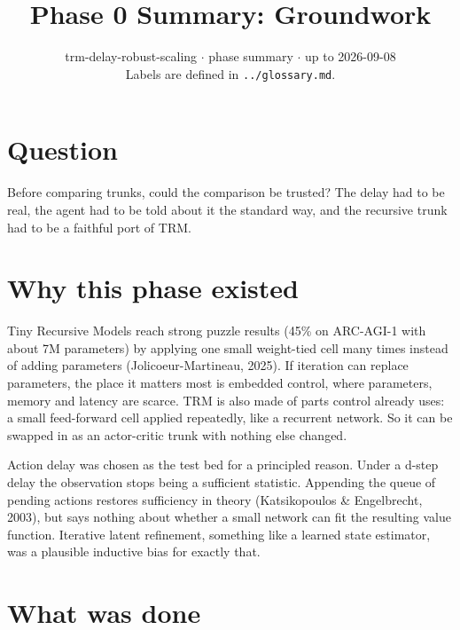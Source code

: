 \documentclass[11pt]{article}
\title{Phase 0 Summary: Groundwork}
\author{}
\date{trm-delay-robust-scaling $\cdot$ phase summary $\cdot$ up to 2026-09-08\\[2pt]Labels are defined in \texttt{.\allowbreak{}.\allowbreak{}/\allowbreak{}glossary.\allowbreak{}md}.}
\begin{document}
\maketitle
\section*{Question}



Before comparing trunks, could the comparison be trusted? The delay had to be real, the agent had to be told about it the standard way, and the recursive trunk had to be a faithful port of TRM.



\section*{Why this phase existed}



Tiny Recursive Models reach strong puzzle results (45\% on ARC-AGI-1 with about 7M parameters) by applying one small weight-tied cell many times instead of adding parameters (Jolicoeur-Martineau, 2025). If iteration can replace parameters, the place it matters most is embedded control, where parameters, memory and latency are scarce. TRM is also made of parts control already uses: a small feed-forward cell applied repeatedly, like a recurrent network. So it can be swapped in as an actor-critic trunk with nothing else changed.



Action delay was chosen as the test bed for a principled reason. Under a d-step delay the observation stops being a sufficient statistic. Appending the queue of pending actions restores sufficiency in theory (Katsikopoulos \& Engelbrecht, 2003), but says nothing about whether a small network can fit the resulting value function. Iterative latent refinement, something like a learned state estimator, was a plausible inductive bias for exactly that.



\section*{What was done}
\end{document}
